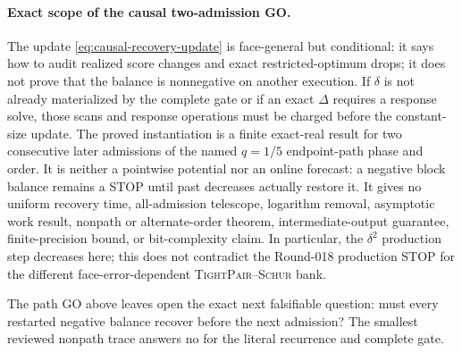 \paragraph{Exact scope of the causal two-admission GO.}
The update \cref{eq:causal-recovery-update} is face-general but conditional:
it says how to audit realized score changes and exact restricted-optimum drops;
it does not prove that the balance is nonnegative on another execution.  If
$\delta$ is not already materialized by the complete gate or if an exact
$\Delta$ requires a response solve, those scans and response operations must
be charged before the constant-size update.  The proved instantiation is a
finite exact-real result for two consecutive later admissions of the named
$q=1/5$ endpoint-path phase and order.  It is neither a pointwise potential
nor an online forecast: a negative block balance remains a STOP until past
decreases actually restore it.  It gives no uniform recovery time,
all-admission telescope, logarithm removal, asymptotic work result, nonpath or
alternate-order theorem, intermediate-output guarantee, finite-precision
bound, or bit-complexity claim.  In particular, the $\delta^2$ production
step decreases here; this does not contradict the Round-018 production STOP
for the different face-error-dependent \textsc{TightPair--Schur} bank.

The path GO above leaves open the exact next falsifiable question: must every
restarted negative balance recover before the next admission?  The smallest
reviewed nonpath trace answers no for the literal recurrence and complete
gate.
